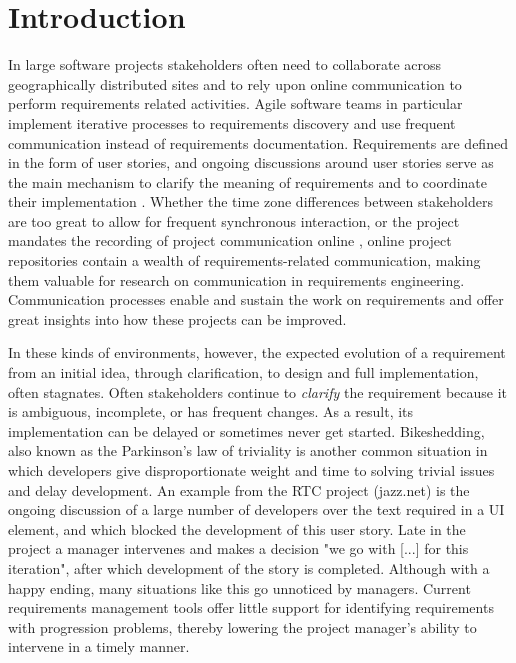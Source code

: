 \section{Introduction}

In  large software projects stakeholders often need to collaborate across geographically distributed sites and to rely upon online communication to perform requirements related activities. Agile software teams in particular implement iterative processes to requirements discovery and use frequent communication instead of requirements documentation. 
Requirements are defined in the form of user stories, and ongoing discussions around user stories serve as the main mechanism to clarify the meaning of requirements and to coordinate their implementation \cite{Cao2008}. Whether the time zone differences between stakeholders are too great to allow for frequent synchronous interaction, or the project mandates the recording of project communication online  \cite{Frost2007}, online project repositories contain a wealth of requirements-related communication, making them valuable for research on communication in requirements engineering. 
Communication processes enable and sustain the work on requirements and offer great insights into how these projects can be improved. 

In these kinds of environments, however, the expected evolution of a requirement from an initial idea, through clarification, to design and full implementation, often stagnates. 
Often stakeholders continue to \emph{clarify} the requirement because it is ambiguous, incomplete, or has frequent changes. 
As a result, its implementation can be delayed or sometimes never get started. 
Bikeshedding, also known as the Parkinson's law of triviality\cite{Parkinson1958} is another common situation in which developers give disproportionate weight and time to solving trivial issues and delay development. 
An example from the RTC project (jazz.net) is the ongoing discussion of a large number of developers over the  text required in a UI element, and which blocked the development of this user story. 
Late in the project a manager intervenes and makes a decision "we go with [...] for this iteration", after which development of the story is completed. 
Although with a happy ending, many situations like this go unnoticed by managers. 
Current requirements management tools offer little support for identifying requirements with progression problems, thereby lowering the project manager's  ability to intervene in a timely manner.

